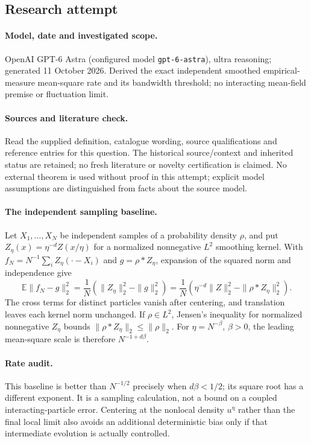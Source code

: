 \documentclass[11pt]{article}
\begin{document}
\subsection{Research attempt}
\paragraph{Model, date and investigated scope.}
OpenAI GPT-6 Astra (configured model \texttt{gpt-6-astra}), ultra reasoning; generated 11 October 2026. Derived the exact independent smoothed empirical-measure mean-square rate and its bandwidth threshold; no interacting mean-field premise or fluctuation limit.

\paragraph{Sources and literature check.}
Read the supplied definition, catalogue wording, source qualifications and reference entries for this question. The historical source/context and inherited status are retained; no fresh literature or novelty certification is claimed. No external theorem is used without proof in this attempt; explicit model assumptions are distinguished from facts about the source model.

\paragraph{The independent sampling baseline.} Let \(X_1,\ldots,X_N\) be independent samples of a probability density \(\rho\), and put \(Z_\eta(x)=\eta^{-d}Z(x/\eta)\) for a normalized nonnegative \(L^2\) smoothing kernel. With \(f_N=N^{-1}\sum_iZ_\eta(\cdot-X_i)\) and \(g=\rho*Z_\eta\), expansion of the squared norm and independence give
\[
 \mathbb E\|f_N-g\|_2^2
 =\frac1N\left(\|Z_\eta\|_2^2-\|g\|_2^2\right)
 =\frac1N\left(\eta^{-d}\|Z\|_2^2-\|\rho*Z_\eta\|_2^2\right).
\]
The cross terms for distinct particles vanish after centering, and translation leaves each kernel norm unchanged. If \(\rho\in L^2\), Jensen's inequality for normalized nonnegative \(Z_\eta\) bounds \(\|\rho*Z_\eta\|_2\le\|\rho\|_2\). For \(\eta=N^{-\beta}\), \(\beta>0\), the leading mean-square scale is therefore \(N^{-1+d\beta}\).
\paragraph{Rate audit.} This baseline is better than \(N^{-1/2}\) precisely when \(d\beta<1/2\); its square root has a different exponent. It is a sampling calculation, not a bound on a coupled interacting-particle error. Centering at the nonlocal density \(u^\eta\) rather than the final local limit also avoids an additional deterministic bias only if that intermediate evolution is actually controlled.
\end{document}
